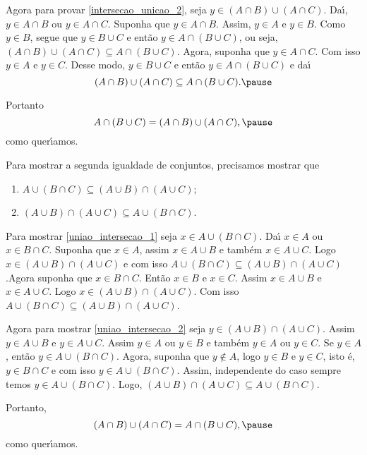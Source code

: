 \documentclass{beamer}
\begin{document}
    \begin{frame}
        Agora para provar \ref{intersecao_unicao_2}, \pause seja $y \in (A \cap B) \cup (A \cap C)$. \pause Da{\'\i}, $y \in A\cap B$ \pause ou $y \in A \cap C$. \pause Suponha que $y \in A \cap B$. \pause Assim, $y \in A$ \pause e $y \in B$. \pause Como $y \in B$, \pause segue que $y \in B \cup C$ \pause e ent{\~a}o $y \in A \cap (B \cup C)$, \pause ou seja, $(A \cap B) \cup (A \cap C) \subseteq A \cap (B \cup C)$. \pause Agora, suponha que $y \in A \cap C$. \pause Com isso $y \in A$ \pause e $y \in C$. \pause Desse modo, $y \in B \cup C$ \pause e ent{\~a}o $y \in A \cap (B \cup C)$ \pause e da{\'\i}\pause
        \[
            (A \cap B) \cup (A \cap C) \subseteq A \cap (B \cup C).\pause
        \]

        Portanto
        \[
            A \cap (B \cup C)=(A \cap B) \cup (A \cap C),\pause
        \]
        como quer{\'\i}amos.
    \end{frame}
    \begin{frame}
        Para mostrar a segunda igualdade de conjuntos, precisamos mostrar que\pause
        \begin{enumerate}[label=({\arabic*})]
            \item $A \cup (B \cap C) \subseteq (A \cup B) \cap (A \cup C)$;\label{uniao_intersecao_1}\pause
            \item $(A \cup B) \cap (A \cup C) \subseteq A \cup (B \cap C)$.\label{uniao_intersecao_2}\pause
        \end{enumerate}

        Para mostrar \ref{uniao_intersecao_1} seja $x \in A \cup (B \cap C)$. \pause Da{\'\i} $x \in A$ \pause ou $x \in B \cap C$. \pause Suponha que $x \in A$, \pause assim $x \in A \cup B$ \pause e tamb\'em $x \in A \cup C$. Logo $x \in (A \cup B) \cap (A \cup C)$ \pause e com isso $A \cup (B \cap C) \subseteq (A \cup B) \cap (A \cup C)$.\pause Agora suponha que $x \in B \cap C$. \pause Ent\~ao $x \in B$ e $x \in C$. Assim $x \in A \cup B$ \pause e $x \in A \cup C$. \pause Logo $x \in (A \cup B) \cap (A \cup C)$. \pause Com isso $A \cup (B \cap C) \subseteq (A \cup B) \cap (A \cup C)$.\pause

        Agora para mostrar \ref{uniao_intersecao_2} seja $y \in (A \cup B) \cap (A \cup C)$. \pause Assim $y \in A \cup B$ \pause e $y \in A \cup C$. \pause Assim $y \in A$ \pause ou $y \in B$ \pause e tamb\'em $y \in A$ \pause ou $y \in C$. \pause Se $y \in A$, \pause ent\~ao $y \in A \cup (B \cap C)$. Agora, suponha que $y \notin A$, \pause logo $y \in B$ e $y \in C$, \pause isto \'e, $y \in B \cap C$ e com isso $y \in A \cup (B \cap C)$. Assim, \pause independente do caso sempre temos $y \in A \cup (B \cap C)$. \pause Logo, $(A \cup B) \cap (A \cup C) \subseteq A \cup (B \cap C)$.\pause

        Portanto,\pause
        \[
            (A\cap B)\cup(A\cap C) = A\cap(B\cup C),\pause
        \]
        como quer{\'\i}amos. \qedsymbol \pause 
    \end{frame}
\end{document}
